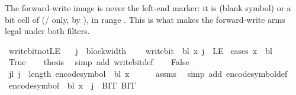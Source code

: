 \begin{isabellebody}
%
\isadelimproof
%
\endisadelimproof
%
\begin{isamarkuptext}%
The forward-write image is never the left-end marker: it is
   (blank symbol) or a bit cell of 
  (/ only, by ),
  in range .  This is what makes the forward-write arms
  legal under both  filters.%
\end{isamarkuptext}\isamarkuptrue%
\isamarkupfalse%
\ write{\isacharunderscore}{\kern0pt}bit{\isacharunderscore}{\kern0pt}not{\isacharunderscore}{\kern0pt}LE{}{\isacharcolon}{\kern0pt}\isanewline
\ \ \ {\isachardoublequoteopen}j\ {\isacharless}{\kern0pt}\ block{\isacharunderscore}{\kern0pt}width\ {\isasymGamma}{\isachardoublequoteclose}\isanewline
\ \ \ {\isachardoublequoteopen}write{\isacharunderscore}{\kern0pt}bit\ {\isasymGamma}\ bl\ x\ j\ {\isasymnoteq}\ LE{}{\isachardoublequoteclose}\isanewline
%
\isadelimproof
%
\endisadelimproof
%
\isatagproof
{}\isamarkupfalse%
\ {\isacharparenleft}{\kern0pt}cases\ {\isachardoublequoteopen}x\ {\isacharequal}{\kern0pt}\ bl{\isachardoublequoteclose}{\isacharparenright}{\kern0pt}\isanewline
\ \ \isamarkupfalse%
\ True\isanewline
\ \ \isamarkupfalse%
\ {\isacharquery}{\kern0pt}thesis\ \isamarkupfalse%
\ {\isacharparenleft}{\kern0pt}simp\ add{\isacharcolon}{\kern0pt}\ write{\isacharunderscore}{\kern0pt}bit{\isacharunderscore}{\kern0pt}def{\isacharparenright}{\kern0pt}\isanewline
{}\isamarkupfalse%
\isanewline
\ \ \isamarkupfalse%
\ False\isanewline
\ \ \isamarkupfalse%
\ jl{\isacharcolon}{\kern0pt}\ {\isachardoublequoteopen}j\ {\isacharless}{\kern0pt}\ length\ {\isacharparenleft}{\kern0pt}encode{\isacharunderscore}{\kern0pt}symbol\ {\isasymGamma}\ bl\ x{\isacharparenright}{\kern0pt}{\isachardoublequoteclose}\isanewline
\ \ \ \ \isamarkupfalse%
\ assms\ \isamarkupfalse%
\ {\isacharparenleft}{\kern0pt}simp\ add{\isacharcolon}{\kern0pt}\ encode{\isacharunderscore}{\kern0pt}symbol{\isacharunderscore}{\kern0pt}def{\isacharparenright}{\kern0pt}\isanewline
\ \ \isamarkupfalse%
\ {\isachardoublequoteopen}encode{\isacharunderscore}{\kern0pt}symbol\ {\isasymGamma}\ bl\ x\ {\isacharbang}{\kern0pt}\ j\ {\isasymin}\ {\isacharbraceleft}{\kern0pt}BIT{}{\isacharcomma}{\kern0pt}\ BIT{}{\isacharbraceright}{\kern0pt}{\isachardoublequoteclose}\isanewline

\end{isabellebody}
